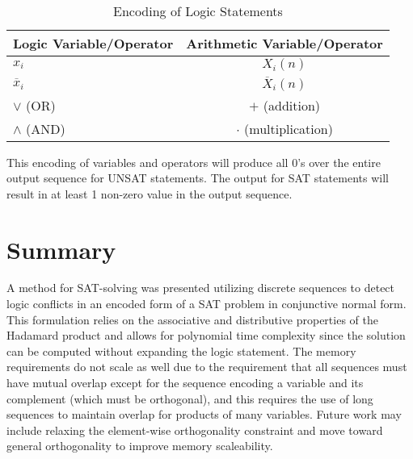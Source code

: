 \documentclass[reqno]{amsart}
\theoremstyle{definition}
\theoremstyle{remark}
\begin{document}
\begin{table}[h]
\centering
\def\arraystretch{1.2}
\begin{tabular}{|l|c|}
\hline
Logic Variable/Operator & Arithmetic Variable/Operator \\
\hline
$x_i$ & $X_i(n)$ \\
\hline
$\overline{x}_i$ & $\overline{X}_i(n)$ \\
\hline
$\vee $ (OR) & $+$ (addition) \\
\hline
$\wedge $ (AND) & $\cdot$ (multiplication) \\
\hline
\end{tabular}
\caption{Encoding of Logic Statements}
\label{tab:template}
\end{table}

\noindent
This encoding of variables and operators will produce all 0's over the entire output sequence 
for UNSAT statements. The output for SAT statements will result in at least 1 non-zero value 
in the output sequence.


\pagebreak
\section{Summary}
\noindent
A method for SAT-solving was presented utilizing discrete sequences to detect logic conflicts in an encoded form of a SAT problem in conjunctive normal form. This formulation relies on the associative and distributive properties of the Hadamard product and allows for polynomial time complexity since the solution can be computed without expanding the logic statement. The memory requirements do not scale as well due to the requirement that all sequences must have mutual overlap except for the sequence encoding a variable and its complement (which must be orthogonal), and this requires the use of long sequences to maintain overlap for products of many variables. Future work may include relaxing the element-wise orthogonality constraint and move toward general orthogonality to improve memory scaleability.




\end{document}
